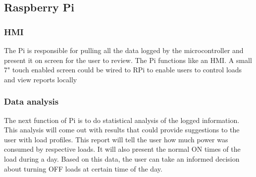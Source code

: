 \documentclass[11pt]{article}
\begin{document}
\subsection{Raspberry Pi}
\label{sec:org19a7111}
\subsubsection{HMI}
\label{sec:org7e244bf}
The Pi is responsible for pulling all the data logged by the
microcontroller and present it on screen for the user to review. The
Pi functions like an HMI. A small 7" touch enabled screen could be
wired to RPi to enable users to control loads and view reports locally
\subsubsection{Data analysis}
\label{sec:orga0498b6}
The next function of Pi is to do statistical analysis of the logged
information. This analysis will come out with results that could
provide suggestions to the user with load profiles. This report will
tell the user how much power was consumed by respective loads. It will
also present the normal ON times of the load during a day. Based on
this data, the user can take an informed decision about turning OFF
loads at certain time of the day.
\end{document}
